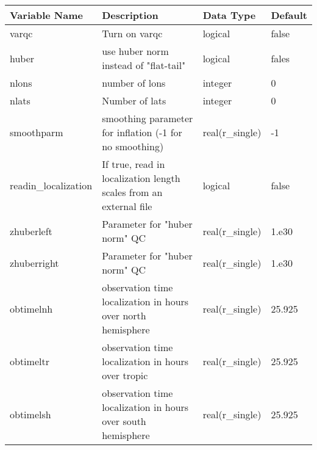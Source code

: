 \begin{table}[htbp]
\centering
\begin{tabular}{p{3cm}p{7cm}p{2.5cm}p{1.5cm}}
\hline
Variable Name&Description&Data Type&Default\\
\hline
varqc&Turn on varqc & logical & false \\
huber&use huber norm instead of "flat-tail" &logical & fales\\
nlons&number of lons &integer&0\\
nlats&Number of lats & integer & 0\\
 smoothparm&smoothing parameter for inflation (-1 for no smoothing) & real(r\_single) & -1\\
readin\_localization&If true, read in localization length scales from an external file & logical & false\\
zhuberleft&Parameter for "huber norm" QC  & real(r\_single) & 1.e30\\
  zhuberright&Parameter for "huber norm" QC & real(r\_single) &1.e30\\
   obtimelnh&observation time localization in hours over north hemisphere & real(r\_single) &25.925\\
obtimeltr&observation time localization in hours over tropic & real(r\_single) & 25.925\\
    obtimelsh& observation time localization in hours over south hemisphere & real(r\_single) &25.925\\
    

\end{tabular}
\end{table}
